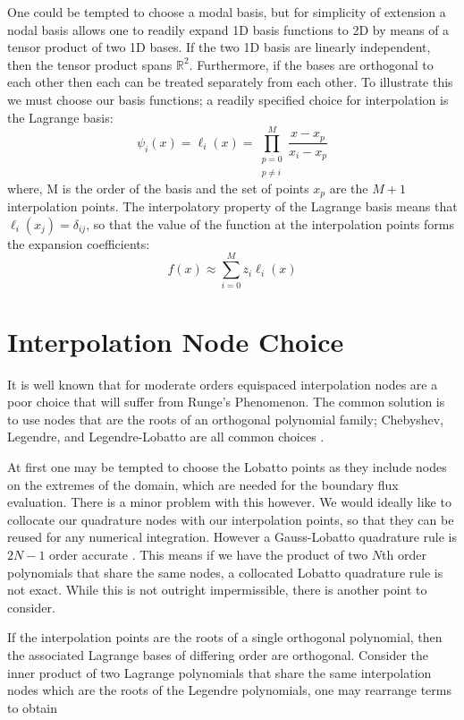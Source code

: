 \documentclass[letterpaper,12pt]{report}
\newcommand{\be}{\begin{equation}}
\newcommand{\ee}{\end{equation}}
\begin{document}
One could be tempted to choose a modal basis, but for simplicity of extension a nodal basis allows one to readily expand 1D basis functions to 2D by means of a tensor product of two 1D bases. If the two 1D basis are linearly independent, then the tensor product spans $\mathbb{R}^2$. Furthermore, if the bases are orthogonal to each other then each can be treated separately from each other. To illustrate this we must choose our basis functions; a readily specified choice for interpolation is the Lagrange basis:
\be \psi_i(x) =\ell_i(x) = \prod_{\substack{p=0\\ p\neq i}}^M \frac{x-x_p}{x_i-x_p}\ee
where, M is the order of the basis and the set of points ${x_p}$ are the $M+1$ interpolation points. The interpolatory property of the Lagrange basis means that $\ell_i(x_j) = \delta_{ij}$, so that the value of the function at the interpolation points forms the expansion coefficients:
\be f(x) \approx \sum_{i=0}^M z_i \ell_i(x) \ee

%
\section{Interpolation Node Choice}\label{INC}
It is well known that for moderate orders equispaced interpolation nodes are a poor choice that will suffer from Runge's Phenomenon. The common solution is to use nodes that are the roots of an orthogonal polynomial family; Chebyshev, Legendre, and Legendre-Lobatto are all common choices \cite{Roni}. 

At first one may be tempted to choose the Lobatto points as they include nodes on the extremes of the domain, which are needed for the boundary flux evaluation. There is a minor problem with this however. We would ideally like to collocate our quadrature nodes with our interpolation points, so that they can be reused for any numerical integration. However a Gauss-Lobatto quadrature rule is $2N-1$ order accurate \cite{Roni}. This means if we have the product of two $N$th order polynomials that share the same nodes, a collocated Lobatto quadrature rule is not exact. While this is not outright impermissible, there is another point to consider.

If the interpolation points are the roots of a single orthogonal polynomial, then the associated Lagrange bases of differing order are orthogonal. Consider the inner product of two Lagrange polynomials that share the same interpolation nodes which are the roots of the Legendre polynomials, one may rearrange terms to obtain
\end{document}
